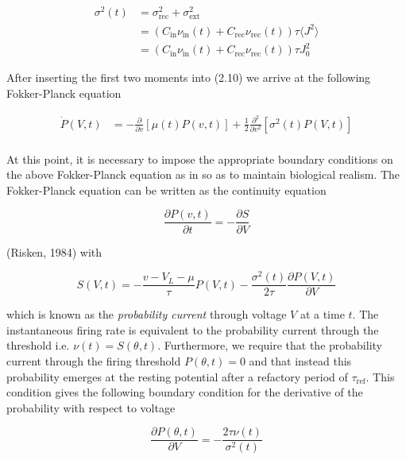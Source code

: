 \documentclass{ucetd}
\begin{document}
\begin{align*}
\sigma^{2}(t) &= \sigma_{\mathrm{rec}}^{2} + \sigma_{\mathrm{ext}}^{2}\\
&= \left(C_{\mathrm{in}}\nu_{\mathrm{in}}(t) + C_{\mathrm{rec}}\nu_{\mathrm{rec}}(t)\right)\tau\langle J^{2}\rangle\\
&= \left(C_{\mathrm{in}}\nu_{\mathrm{in}}(t) + C_{\mathrm{rec}}\nu_{\mathrm{rec}}(t)\right)\tau J_{0}^{2}
\end{align*}

After inserting the first two moments into (2.10) we arrive at the following Fokker-Planck equation

\begin{align*}
\dot{P}(V,t) &= -\frac{\partial}{\partial v}[\mu(t)P(v,t)] + \frac{1}{2}\frac{\partial^{2}}{\partial v^{2}}[\sigma^{2}(t)P(V,t)]\\
\end{align*} 

At this point, it is necessary to impose the appropriate boundary conditions on the above Fokker-Planck equation as in so as to maintain biological realism. The Fokker-Planck equation can be written as the continuity equation 

\begin{equation*}
\frac{\partial P(v,t)}{\partial t} = -\frac{\partial S}{\partial V}
\end{equation*}

(Risken, 1984) with 

\begin{equation*}
S(V,t) = -\frac{v-V_{L}-\mu}{\tau}P(V,t) - \frac{\sigma^{2}(t)}{2\tau}\frac{\partial P(V,t)}{\partial V}
\end{equation*}

which is known as the \emph{probability current} through voltage $V$ at a time $t$. The instantaneous firing rate is equivalent to the probability current through the threshold i.e. $\nu(t) = S(\theta,t)$. Furthermore, we require that the probability current through the firing threshold $P(\theta, t)=0$ and that instead this probability emerges at the resting potential after a refactory period of $\tau_{\mathrm{ref}}$. This condition gives the following boundary condition for the derivative of the probability with respect to voltage

\begin{equation*}
\frac{\partial P(\theta,t)}{\partial V} = -\frac{2\tau\nu(t)}{\sigma^{2}(t)}
\end{equation*}
\end{document}
